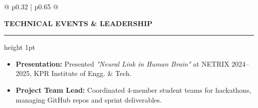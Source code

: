 \documentclass[a4paper,10pt]{article}
\begin{document}
\begin{mdframed}[style=resumebox]
\begin{tabularx}{\textwidth}{@{} p{0.32\textwidth} | p{0.65\textwidth} @{}}
\begin{minipage}[t]{\linewidth}
    \vspace{6pt}
    \textbf{\color{primaryblack}\large TECHNICAL EVENTS \& LEADERSHIP}
    \vspace{2pt}\hrule height 1pt\vspace{3pt}
    \begin{itemize}
        \item \textbf{Presentation:} Presented \textit{"Neural Link in Human Brain"} at NETRIX 2024--2025, KPR Institute of Engg. \& Tech.
        \item \textbf{Project Team Lead:} Coordinated 4-member student teams for hackathons, managing GitHub repos and sprint deliverables.
    \end{itemize}
\end{minipage}
\end{tabularx}

\end{mdframed}
\end{document}

